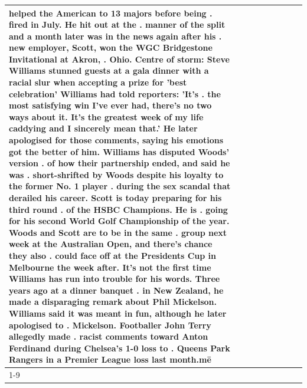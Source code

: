 \begin{table}[H]
\begin{tabular}{lllrlllll}
helped the American to 13 majors before being . fired in July. He hit out at the . manner of the split and a month later was in the news again after his . new employer, Scott, won the WGC Bridgestone Invitational at Akron, . Ohio. Centre of storm: Steve Williams stunned guests at a gala dinner with a racial slur when accepting a prize for 'best celebration' Williams had told reporters: 'It's . the most satisfying win I've ever had, there's no two ways about it. It's the greatest week of my life caddying and I sincerely mean that.' He later apologised for those comments, saying his emotions got the better of him. Williams has disputed Woods' version . of how their partnership ended, and said he was . short-shrifted by Woods despite his loyalty to the former No. 1 player . during the sex scandal that derailed his career. Scott is today preparing for his third round . of the HSBC Champions. He is . going for his second World Golf Championship of the year. Woods and Scott are to be in the same . group next week at the Australian Open, and there's chance they also . could face off at the Presidents Cup in Melbourne the week after. It's not the first time Williams has run into trouble for his words. Three years ago at a dinner banquet . in New Zealand, he made a disparaging remark about Phil Mickelson. Williams said it was meant in fun, although he later apologised to . Mickelson. Footballer John Terry allegedly made . racist comments toward Anton Ferdinand during Chelsea's 1-0 loss to . Queens Park Rangers in a Premier League loss last month.mē \\
\cline{1-9}

\end{tabular}
\end{table}
